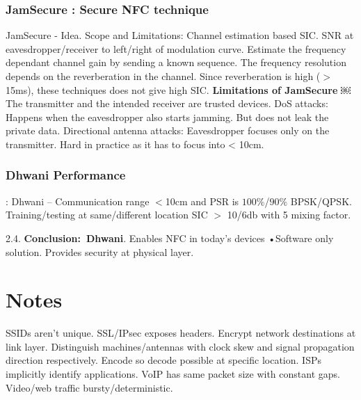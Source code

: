 \documentclass[9pt]{extarticle}
\begin{document}
\begin{multicols}{2}
\subsubsection{JamSecure : Secure NFC technique}

JamSecure - Idea. Scope and Limitations: Channel estimation based SIC. SNR at eavesdropper/receiver to left/right of modulation curve. Estimate the frequency dependant channel gain by sending a known sequence. The frequency resolution depends on the reverberation in the channel. Since reverberation is high ($>$15ms), these techniques does not give high SIC. \textbf{Limitations of JamSecure} ￼The transmitter and the intended receiver are trusted devices.
DoS attacks: Happens when the eavesdropper also starts jamming. But does not leak the private data. Directional antenna attacks: Eavesdropper focuses only on the transmitter. Hard in practice as it has to focus into < 10cm.

\subsubsection{Dhwani Performance}: Dhwani – Communication range $<$10cm and PSR is $100\%$/$90\%$ BPSK/QPSK. Training/testing at same/different location SIC $>$ 10/6db with 5 mixing factor.

2.4. \textbf{Conclusion:\ Dhwani}. Enables NFC in today’s devices •Software only solution. Provides security at physical layer.

\section{Notes}

SSIDs aren't unique. SSL/IPsec exposes headers. Encrypt network destinations at link layer. Distinguish machines/antennas with clock skew and signal propagation direction respectively. Encode so decode possible at specific location. ISPs implicitly identify applications. VoIP has same packet size with constant gaps. Video/web traffic bursty/deterministic.

\end{multicols}
\end{document}
